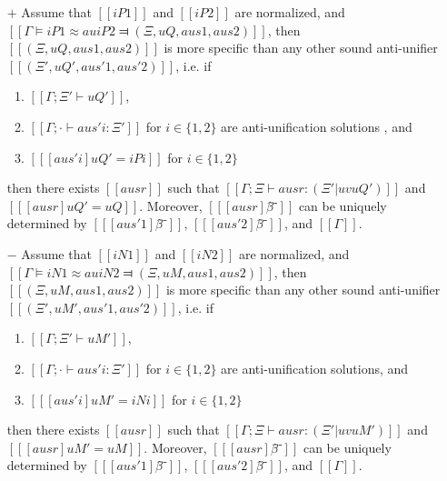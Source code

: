 \begin{lemma} \label{lemma:anti-unification-initial}
    \hfill
    \begin{itemize}
        \item [$+$] 
            Assume that $[[iP1]]$ and $[[iP2]]$ are normalized, and
            $[[Γ ⊨ iP1 ≈au iP2 ⫤ (Ξ, uQ, aus1, aus2)]]$, 
            then $[[(Ξ, uQ, aus1, aus2)]]$ is more specific than
            any other sound anti-unifier $[[(Ξ', uQ', aus'1, aus'2)]]$, i.e.
            if 
            \begin{enumerate}
                \item $[[Γ ; Ξ' ⊢ uQ']]$,
                \item $[[Γ ; · ⊢ aus'i : Ξ']]$ for $i \in \{1,2\}$
                are anti-unification solutions , and
                \item $[[ [aus'i] uQ' = iPi ]]$ for $i \in \{1,2\}$
            \end{enumerate}
            then there exists $[[ausr]]$ such that
            $[[Γ ; Ξ ⊢ ausr : (Ξ' | uv uQ')]]$ and $[[ [ausr] uQ' = uQ ]]$. 
            Moreover, $[[ [ausr]β̂⁻]]$ can
            be uniquely determined by $[[ [aus'1]β̂⁻ ]]$, $[[ [aus'2]β̂⁻ ]]$, and
            $[[Γ]]$.
        \item [$-$] 
            Assume that $[[iN1]]$ and $[[iN2]]$ are normalized, and
            $[[Γ ⊨ iN1 ≈au iN2 ⫤ (Ξ, uM, aus1, aus2)]]$, 
            then $[[(Ξ, uM, aus1, aus2)]]$ is more specific than
            any other sound anti-unifier $[[(Ξ', uM', aus'1, aus'2)]]$, i.e.
            if
            \begin{enumerate}
                \item $[[Γ ; Ξ' ⊢ uM']]$,
                \item $[[Γ ; · ⊢ aus'i : Ξ']]$ for $i \in \{1,2\}$
                are anti-unification solutions, and
                \item $[[ [aus'i] uM' = iNi ]]$ for $i \in \{1,2\}$
            \end{enumerate}
            then there exists $[[ausr]]$ such that
            $[[Γ ; Ξ ⊢ ausr : (Ξ' | uv uM')]]$ and $[[ [ausr] uM' = uM ]]$.
            Moreover, $[[ [ausr]β̂⁻]]$ can
            be uniquely determined by $[[ [aus'1]β̂⁻ ]]$, $[[ [aus'2]β̂⁻ ]]$, and
            $[[Γ]]$.
    \end{itemize}
\end{lemma}
